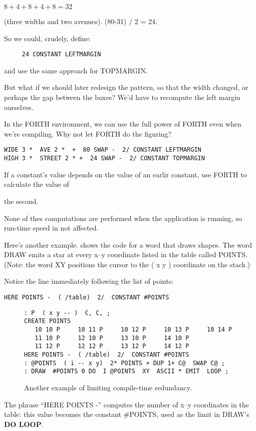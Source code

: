 $8 + 4 + 8 + 4 + 8 = 32$

\medskip

\noindent
(three widths and two avenues). (80-31) / 2 = 24.

So we could, crudely, define:

\begin{verbatim}
     24 CONSTANT LEFTMARGIN
\end{verbatim}
and use the same approach for TOPMARGIN.

But what if we should later redesign the pattern, so that the width changed, or perhaps the gap between the boxes? We'd have to recompute the left margin ourselves.

In the FORTH environment, we can use the full power of FORTH even when we're compiling. Why not let FORTH do the figuring?

\begin{verbatim}
WIDE 3 *  AVE 2 *  +  80 SWAP -  2/ CONSTANT LEFTMARGIN
HIGH 3 *  STREET 2 * +  24 SWAP -  2/ CONSTANT TOPMARGIN
\end{verbatim}

\begin{tip}
If a constant's value depends on the value of an earlir constant, use FORTH to calculate the value of

the second.
\end{tip}
None of thes computations are performed when the application is running, so run-time speed in not affected.

Here's another example.  shows the code for a word that draws shapes. The word DRAW emits a star at every x--y coordinate listed in the table called POINTS. (Note: the word XY positions the cursor to the ( x y ) coordinate on the stack.)

Notice the line immediately following the list of points:

\begin{verbatim}
HERE POINTS -  ( /table)  2/  CONSTANT #POINTS
\end{verbatim}
\begin{figure*}[tttt]
\caption{Another example of limiting compile-time redundancy.}
\begin{center}
\begin{BVerbatim}
: P  ( x y -- )  C, C, ;
CREATE POINTS
   10 10 P     10 11 P     10 12 P     10 13 P     10 14 P
   11 10 P     12 10 P     13 10 P     14 10 P
   11 12 P     12 12 P     13 12 P     14 12 P
HERE POINTS -  ( /table)  2/  CONSTANT #POINTS
: @POINTS  ( i -- x y)  2* POINTS + DUP 1+ C@  SWAP C@ ;
: DRAW  #POINTS 0 DO  I @POINTS  XY  ASCII * EMIT  LOOP ;
\end{BVerbatim}
\end{center}
\end{figure*}
The phrase ``HERE POINTS -'' computes the number of x--y coordinates in the table: this value becomes the constant \#POINTS, used as the limit in DRAW's \textbf{DO LOOP}.

